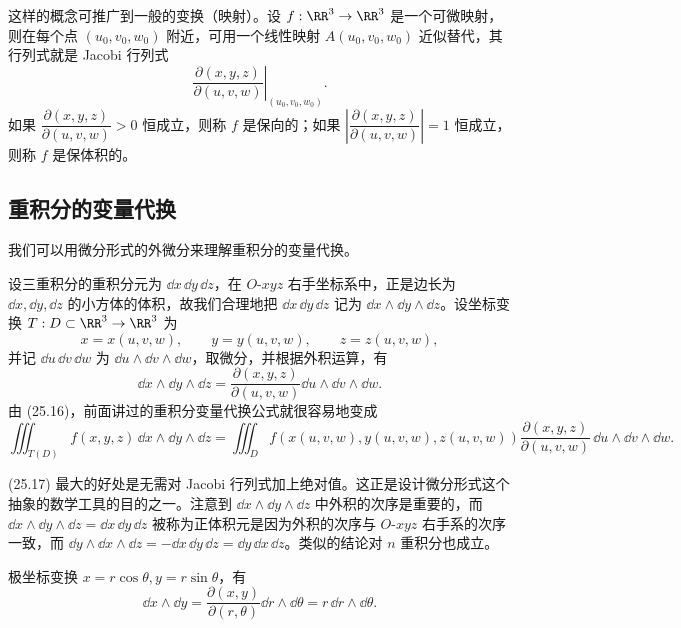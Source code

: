 这样的概念可推广到一般的变换（映射）。设 $f:\RR^3\to\RR^3$ 是一个可微映射，则在每个点 $(u_0,v_0,w_0)$ 附近，可用一个线性映射 $A(u_0,v_0,w_0)$ 近似替代，其行列式就是 Jacobi 行列式
\[
  \left.\frac{\partial(x,y,z)}{\partial(u,v,w)}\right|_{(u_0,v_0,w_0)}.
\]
如果 $\dfrac{\partial(x,y,z)}{\partial(u,v,w)}>0$ 恒成立，则称 $f$ 是保向的；如果 $\left|\dfrac{\partial(x,y,z)}{\partial(u,v,w)}\right|=1$ 恒成立，则称 $f$ 是保体积的。

\subsection{重积分的变量代换}

我们可以用微分形式的外微分来理解重积分的变量代换。

设三重积分的重积分元为 $\dd x\,\dd y\,\dd z$，在 $O$-$xyz$ 右手坐标系中，正是边长为 $\dd x,\dd y,\dd z$ 的小方体的体积，故我们合理地把 $\dd x\,\dd y\,\dd z$ 记为 $\dd x\wedge\dd y\wedge\dd z$。设坐标变换 $T:D\subset\RR^3\to\RR^3$ 为
\[
  x=x(u,v,w),\qquad y=y(u,v,w),\qquad z=z(u,v,w),
\]
并记 $\dd u\,\dd v\,\dd w$ 为 $\dd u\wedge\dd v\wedge\dd w$，取微分，并根据外积运算，有
\begin{equation}
  \dd x\wedge\dd y\wedge\dd z
  =\frac{\partial(x,y,z)}{\partial(u,v,w)}\dd u\wedge\dd v\wedge\dd w.
  \tag{25.16}
\end{equation}
由 (25.16)，前面讲过的重积分变量代换公式就很容易地变成
\begin{equation}
  \iiint_{T(D)}f(x,y,z)\,\dd x\wedge\dd y\wedge\dd z
  =\iiint_Df(x(u,v,w),y(u,v,w),z(u,v,w))
  \frac{\partial(x,y,z)}{\partial(u,v,w)}\,\dd u\wedge\dd v\wedge\dd w.
  \tag{25.17}
\end{equation}

\begin{xremark}
(25.17) 最大的好处是无需对 Jacobi 行列式加上绝对值。这正是设计微分形式这个抽象的数学工具的目的之一。注意到 $\dd x\wedge\dd y\wedge\dd z$ 中外积的次序是重要的，而 $\dd x\wedge\dd y\wedge\dd z=\dd x\,\dd y\,\dd z$ 被称为正体积元是因为外积的次序与 $O$-$xyz$ 右手系的次序一致，而 $\dd y\wedge\dd x\wedge\dd z=-\dd x\,\dd y\,\dd z=\dd y\,\dd x\,\dd z$。类似的结论对 $n$ 重积分也成立。
\end{xremark}

\begin{xexample}[25.4.4]
极坐标变换 $x=r\cos\theta,y=r\sin\theta$，有
\[
  \dd x\wedge\dd y=\frac{\partial(x,y)}{\partial(r,\theta)}\dd r\wedge\dd\theta
  =r\,\dd r\wedge\dd\theta.
\]
\end{xexample}

